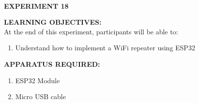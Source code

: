 \documentclass[12pt,a4paper]{article}
\begin{document}
\begin{center}

\textbf{\large \\EXPERIMENT 18}\\[6pt]
\end{center}

\textbf{\large LEARNING OBJECTIVES:}\\[3pt]
At the end of this experiment, participants will be able to:\vspace{-6mm}\begin{enumerate}
 \setlength\itemsep{-0.3em}
\item Understand how to implement a WiFi repeater using ESP32 \\
\end{enumerate}
\textbf{\large APPARATUS REQUIRED:}\\
\vspace{-3mm}
\begin{enumerate}
 \setlength\itemsep{-0.3em}
\item ESP32 Module\\
\item Micro USB cable\\
\end{enumerate}
\end{document}
